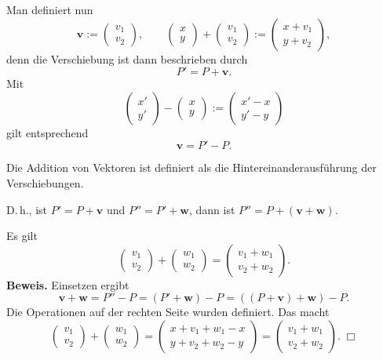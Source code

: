 \documentclass[9pt]{beamer}
\newcommand{\bv}[1]{\mathbf{#1}}
\newcommand{\strong}[1]{\textsf{\textbf{#1}}}
\renewcommand{\qedsymbol}{\ensuremath{\Box}}
\newcommand{\parspace}{\vspace{0.8em}}
\begin{document}
\begin{frame}
Man definiert nun
\[\bv v := \begin{pmatrix}v_1\\ v_2\end{pmatrix},\qquad
\begin{pmatrix}x\\ y\end{pmatrix} + \begin{pmatrix}v_1\\ v_2\end{pmatrix}
:= \begin{pmatrix}x+v_1\\ y+v_2\end{pmatrix},\]
denn die Verschiebung ist dann beschrieben durch
\[P' = P + \bv v.\]\pause
Mit
\[\begin{pmatrix}x'\\ y'\end{pmatrix} - \begin{pmatrix}x\\ y\end{pmatrix}
:= \begin{pmatrix}x'-x\\ y'-y\end{pmatrix}\]
gilt entsprechend
\[\bv v = P' - P.\]
\end{frame}

\begin{frame}
Die Addition von Vektoren ist definiert als die Hintereinanderausführung
der Verschiebungen.

\parspace
D.\,h., ist $P' = P+\bv v$ und $P'' = P'+\bv w$,
dann ist $P'' = P+(\bv v+\bv w)$.\pause

\parspace
Es gilt
\[\begin{pmatrix}v_1\\ v_2\end{pmatrix} + \begin{pmatrix}w_1\\ w_2\end{pmatrix}
= \begin{pmatrix}v_1+w_1\\ v_2+w_2\end{pmatrix}.\]\pause
\strong{Beweis.} Einsetzen ergibt
\[\bv v+\bv w = P''-P = (P'+\bv w)-P = ((P+\bv v)+\bv w)-P.\]
Die Operationen auf der rechten Seite wurden definiert. Das macht
\[\begin{pmatrix}v_1\\ v_2\end{pmatrix} + \begin{pmatrix}w_1\\ w_2\end{pmatrix}
= \begin{pmatrix}x + v_1 + w_1 - x\\ y + v_2 + w_2 - y\end{pmatrix}
= \begin{pmatrix}v_1 + w_1\\ v_2 + w_2\end{pmatrix}.\;\qedsymbol\]
\end{frame}
\end{document}
